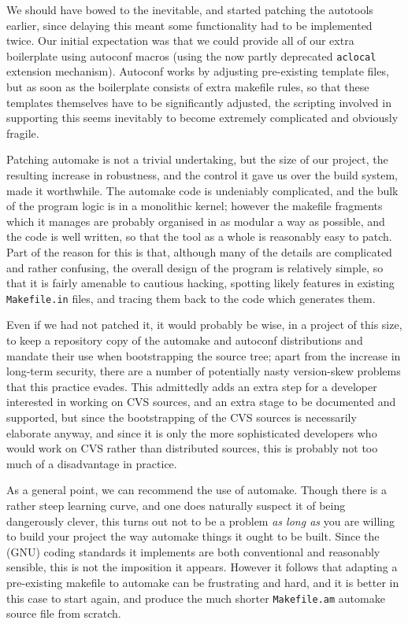 \documentclass{speauth}
\begin{document}
We should have bowed to the inevitable, and started patching the
autotools earlier, since delaying this meant some functionality had to
be implemented twice.  Our initial expectation was that we could
provide all of our extra boilerplate using autoconf macros (using the
now partly deprecated \texttt{aclocal} extension mechanism).  Autoconf
works by adjusting pre-existing template files, but as soon as the
boilerplate consists of extra makefile rules, so that these templates
themselves have to be significantly adjusted, the scripting involved
in supporting this seems inevitably to become extremely complicated
and obviously fragile.

Patching automake is not a trivial undertaking, but the size of our
project, the resulting increase in robustness, and the control it gave
us over the build system, made it worthwhile.  The automake code is
undeniably complicated, and the bulk of the program logic is in a
monolithic kernel; however the makefile fragments which it manages are
probably organised in as modular a way as possible, and the code is
well written, so that the tool as a whole is reasonably easy to patch.
Part of the reason for this is that, although many of the details are
complicated and rather confusing, the overall design of the program is
relatively simple, so that it is fairly amenable to cautious hacking,
spotting likely features in existing \texttt{Makefile.in} files, and
tracing them back to the code which generates them.

Even if we had not patched it, it
would probably be wise, in a project of this size, to keep a
repository copy of the automake and autoconf distributions and mandate
their use when bootstrapping the source tree; apart from the increase
in long-term security, there are a number of potentially nasty
version-skew problems that this practice evades.  This admittedly adds
an extra step for a developer interested in working on CVS sources,
and an extra stage to be documented and supported,
but since the bootstrapping of the CVS sources is necessarily
elaborate anyway, and since it is only the more sophisticated
developers who would work on CVS rather than distributed sources, this
is probably not too much of a disadvantage in practice.

As a general point, we can recommend the use of automake.  Though
there is a rather steep learning curve, and one does naturally suspect
it of being dangerously clever, this turns out not to be a problem
\emph{as long as} you are willing to build your project the way
automake things it ought to be built.  Since the (GNU) coding
standards it implements are both conventional and reasonably sensible,
this is not the imposition it appears.  However it follows that
adapting a pre-existing makefile to automake can be frustrating and
hard, and it is better in this case to start again, and produce the
much shorter \texttt{Makefile.am} automake source file from scratch.
\end{document}
